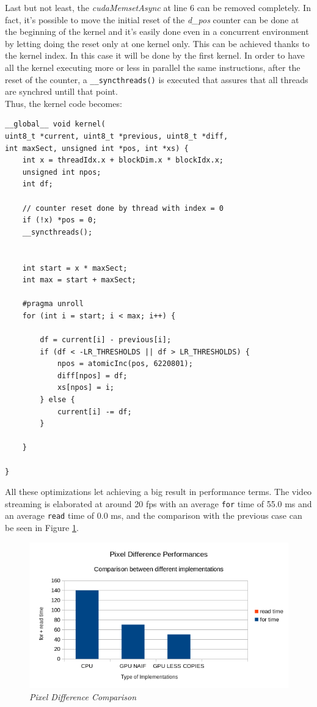 \documentclass[paper=a4, fontsize=10pt]{scrartcl}	%
\begin{document}
	Last but not least, the \textit{cudaMemsetAsync} at line 6 can be removed completely. In fact, it's possible to move the initial reset of the \textit{d\_pos} counter can be done at the beginning of the kernel and it's easily done even in a concurrent environment by letting doing the reset only at one kernel only. This can be achieved thanks to the kernel index. In this case it will be done by the first kernel. In order to have all the kernel executing more or less in parallel the same instructions, after the reset of the counter, a \texttt{\_\_syncthreads()} is executed that assures that all threads are synchred untill that point. \\

	Thus, the kernel code becomes:

	\begin{lstlisting}[style=CStyle]
__global__ void kernel(
uint8_t *current, uint8_t *previous, uint8_t *diff, 
int maxSect, unsigned int *pos, int *xs) {
	int x = threadIdx.x + blockDim.x * blockIdx.x;
	unsigned int npos;
	int df;

	// counter reset done by thread with index = 0
	if (!x) *pos = 0;
	__syncthreads();


	int start = x * maxSect;
	int max = start + maxSect;

	#pragma unroll
	for (int i = start; i < max; i++) {

		df = current[i] - previous[i];
		if (df < -LR_THRESHOLDS || df > LR_THRESHOLDS) {
			npos = atomicInc(pos, 6220801);
			diff[npos] = df;
			xs[npos] = i;
		} else {
			current[i] -= df;
		}

	}

}
	\end{lstlisting}

	All these optimizations let achieving a big result in performance terms. The video streaming is elaborated at around 20 fps with an average \texttt{for} time of 55.0 ms and an average \texttt{read} time of 0.0 ms, and the comparison with the previous case can be seen in Figure \ref{fig:chart3}. 

	\begin{figure}[H]
		\centering
		\includegraphics[width=0.8\linewidth]{images/chart3.png}
		\caption{\textit{Pixel Difference Comparison}}
		\label{fig:chart3}
	\end{figure}
\end{document}
